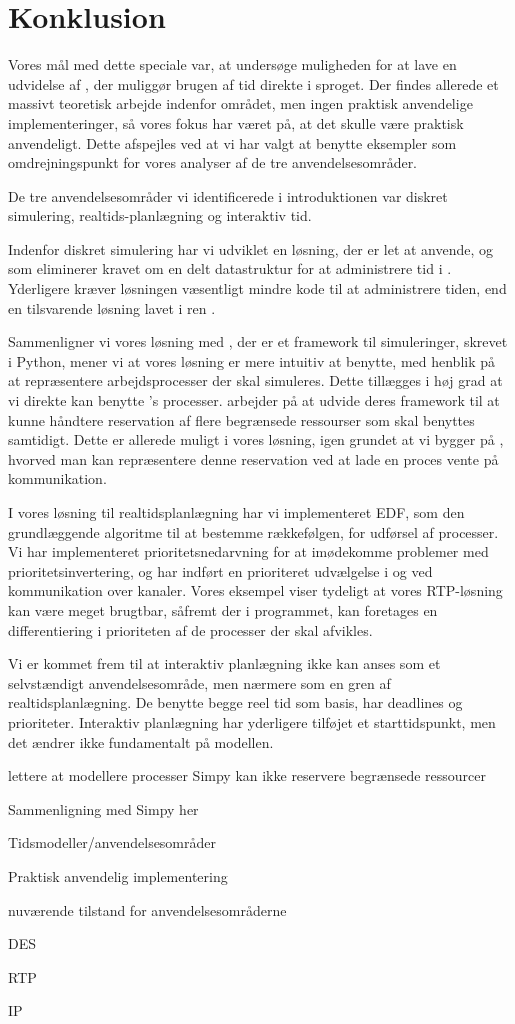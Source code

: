 \chapter{Konklusion} 
\label{chap:konklusion}

Vores mål med dette speciale var, at undersøge muligheden for at lave en udvidelse af \pycsp, der muliggør brugen af tid direkte i sproget. Der findes allerede et massivt teoretisk arbejde indenfor området, men ingen praktisk anvendelige implementeringer, så vores fokus har været på, at det skulle være praktisk anvendeligt. Dette afspejles ved at vi har valgt at benytte eksempler som omdrejningspunkt for vores analyser af de tre anvendelsesområder. 

De tre anvendelsesområder vi identificerede i introduktionen var diskret simulering, realtids-planlægning og interaktiv tid. 

Indenfor diskret simulering har vi udviklet en løsning, der er let at anvende, og som eliminerer kravet om en delt datastruktur for at administrere tid i \pycsp. Yderligere kræver løsningen væsentligt mindre kode til at administrere tiden, end en tilsvarende løsning lavet i ren \pycsp. 

Sammenligner vi vores løsning med \simpy, der er et framework til simuleringer, skrevet i Python, mener vi at vores løsning er mere intuitiv at benytte, med henblik på at repræsentere arbejdsprocesser der skal simuleres. Dette tillægges i høj grad at vi direkte kan benytte \pycsp's processer. \simpy arbejder på at udvide deres framework til at kunne håndtere reservation af flere begrænsede ressourser som skal benyttes samtidigt. Dette er allerede muligt i vores løsning, igen grundet at vi bygger på \pycsp, hvorved man kan repræsentere denne reservation ved at lade en proces vente på kommunikation. 

I vores løsning til realtidsplanlægning har vi implementeret EDF, som den grundlæggende algoritme til at bestemme rækkefølgen, for udførsel af processer. Vi har implementeret prioritetsnedarvning for at imødekomme problemer med prioritetsinvertering, og har indført en prioriteret udvælgelse i  og ved kommunikation over kanaler. Vores eksempel viser tydeligt at vores RTP-løsning kan være meget brugtbar, såfremt der i programmet, kan foretages en differentiering i prioriteten af de processer der skal afvikles. 

Vi er kommet frem til at interaktiv planlægning ikke kan anses som et selvstændigt anvendelsesområde, men nærmere som en gren af realtidsplanlægning. De benytte begge reel tid som basis, har deadlines og prioriteter. Interaktiv planlægning har yderligere tilføjet et starttidspunkt, men det ændrer ikke fundamentalt på modellen. 

lettere at modellere processer
Simpy kan ikke reservere begrænsede ressourcer

Sammenligning med Simpy her 

Tidsmodeller/anvendelsesområder

Praktisk anvendelig implementering

nuværende tilstand for anvendelsesområderne

DES

RTP

IP


